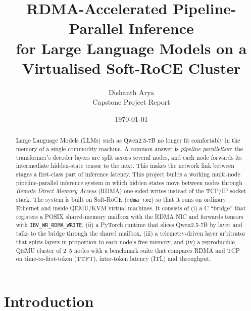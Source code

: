 \documentclass[11pt,a4paper]{article}
\title{\textbf{RDMA-Accelerated Pipeline-Parallel Inference\\for Large Language Models on a Virtualised Soft-RoCE Cluster}}
\author{Dishanth Arya\\ \small Capstone Project Report}
\date{\today}
\begin{document}
\maketitle

\begin{abstract}
Large Language Models (LLMs) such as Qwen2.5-7B no longer fit comfortably in the memory of a single commodity machine. A common answer is \emph{pipeline parallelism}: the transformer's decoder layers are split across several nodes, and each node forwards its intermediate hidden-state tensor to the next. This makes the network link between stages a first-class part of inference latency. This project builds a working multi-node pipeline-parallel inference system in which hidden states move between nodes through \emph{Remote Direct Memory Access} (RDMA) one-sided writes instead of the TCP/IP socket stack. The system is built on Soft-RoCE (\texttt{rdma\_rxe}) so that it runs on ordinary Ethernet and inside QEMU/KVM virtual machines. It consists of (i) a C ``bridge'' that registers a POSIX shared-memory mailbox with the RDMA NIC and forwards tensors with \texttt{IBV\_WR\_RDMA\_WRITE}, (ii) a PyTorch runtime that slices Qwen2.5-7B by layer and talks to the bridge through the shared mailbox, (iii) a telemetry-driven layer arbitrator that splits layers in proportion to each node's free memory, and (iv) a reproducible QEMU cluster of 2--5 nodes with a benchmark suite that compares RDMA and TCP on time-to-first-token (TTFT), inter-token latency (ITL) and throughput.
\end{abstract}

\tableofcontents
\newpage

\section{Introduction}
\end{document}
